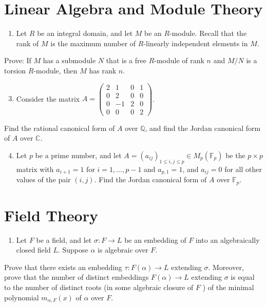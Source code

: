 \documentclass[10pt]{article}
\begin{document}
\section{Linear Algebra and Module Theory}
\begin{enumerate}
  \item Let $R$ be an integral domain, and let $M$ be an $R$-module. Recall that the rank of $M$ is the maximum number of $R$-linearly independent elements in $M$.
\end{enumerate}
Prove: If $M$ has a submodule $N$ that is a free $R$-module of rank $n$ and $M / N$ is a torsion $R$-module, then $M$ has rank $n$.

\begin{enumerate}
  \setcounter{enumi}{2}
  \item Consider the matrix $A=\left(\begin{array}{rrrr}2 & 1 & 0 & 1 \\ 0 & 2 & 0 & 0 \\ 0 & -1 & 2 & 0 \\ 0 & 0 & 0 & 2\end{array}\right)$.
\end{enumerate}
Find the rational canonical form of $A$ over $\mathbb{Q}$, and find the Jordan canonical form of $A$ over $\mathbb{C}$.

\begin{enumerate}
  \setcounter{enumi}{3}
  \item Let $p$ be a prime number, and let $A=\left(a_{i j}\right)_{1 \leq i, j \leq p} \in M_{p}\left(\mathbb{F}_{p}\right)$ be the $p \times p$ matrix with $a_{i+1}=1$ for $i=1, \ldots, p-1$ and $a_{p, 1}=1$, and $a_{i j}=0$ for all other values of the pair $(i, j)$. Find the Jordan canonical form of $A$ over $\mathbb{F}_{p}$.
\end{enumerate}
\section{Field Theory}
\begin{enumerate}
  \item Let $F$ be a field, and let $\sigma: F \rightarrow L$ be an embedding of $F$ into an algebraically closed field $L$. Suppose $\alpha$ is algebraic over $F$.
\end{enumerate}
Prove that there exists an embedding $\tau: F(\alpha) \rightarrow L$ extending $\sigma$. Moreover, prove that the number of distinct embeddings $F(\alpha) \rightarrow L$ extending $\sigma$ is equal to the number of distinct roots (in some algebraic closure of $F$ ) of the minimal polynomial $m_{\alpha, F}(x)$ of $\alpha$ over $F$.
\end{document}
